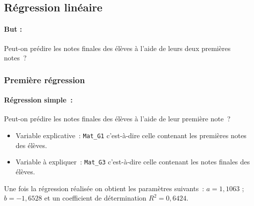 \documentclass[11pt]{article}
\begin{document}
\subsection{Régression linéaire}
\paragraph{But : } Peut-on prédire les notes finales des élèves à l'aide de leurs deux premières notes ?

\subsubsection{Première régression}
\paragraph{Régression simple : } Peut-on prédire les notes finales des élèves à l'aide de leur première note ?~\\
\begin{itemize}
\item Variable explicative : \texttt{Mat\_G1} c'est-à-dire celle contenant les premières notes des élèves.
\item Variable à expliquer : \texttt{Mat\_G3} c'est-à-dire celle contenant les notes finales des élèves.
\end{itemize}
Une fois la régression réalisée on obtient les paramètres suivants : $a=1,1063$ ; $b=-1,6528$ et un coefficient de détermination $R^2=0,6424$.
\end{document}
